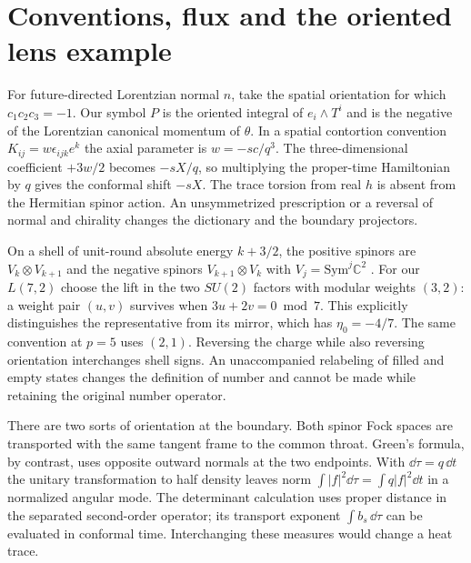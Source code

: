 \section{Conventions, flux and the oriented lens example}\label{app:dict}
For future-directed Lorentzian normal $n$, take the spatial orientation for which $c_1c_2c_3=-1$. Our symbol $P$ is the oriented integral of $e_i\wedge T^i$ and is the negative of the Lorentzian canonical momentum of $\theta$. In a spatial contortion convention $K_{ij}=w\epsilon_{ijk} e^k$ the axial parameter is $w=-s c/q^3$. The three-dimensional coefficient $+3w/2$ becomes $-sX/q$, so multiplying the proper-time Hamiltonian by $q$ gives the conformal shift $-sX$. The trace torsion from real $h$ is absent from the Hermitian spinor action. An unsymmetrized prescription or a reversal of normal and chirality changes the dictionary and the boundary projectors.

On a shell of unit-round absolute energy $k+3/2$, the positive spinors are $V_k\otimes V_{k+1}$ and the negative spinors $V_{k+1}\otimes V_k$ with $V_j=\mathrm{Sym}^j\mathbb C^2$ \cite{BarSpin,P08}. For our $L(7,2)$ choose the lift in the two $SU(2)$ factors with modular weights $(3,2)$: a weight pair $(u,v)$ survives when $3u+2v=0\bmod 7$. This explicitly distinguishes the representative from its mirror, which has $\eta_0=-4/7$. The same convention at $p=5$ uses $(2,1)$. Reversing the charge while also reversing orientation interchanges shell signs. An unaccompanied relabeling of filled and empty states changes the definition of number and cannot be made while retaining the original number operator.

There are two sorts of orientation at the boundary. Both spinor Fock spaces are transported with the same tangent frame to the common throat. Green's formula, by contrast, uses opposite outward normals at the two endpoints. With $\dd\tau=q\,\dd t$ the unitary transformation to half density leaves norm $\int|f|^2\dd\tau=\int q|f|^2\dd t$ in a normalized angular mode. The determinant calculation uses proper distance in the separated second-order operator; its transport exponent $\int b_s\,\dd\tau$ can be evaluated in conformal time. Interchanging these measures would change a heat trace.
